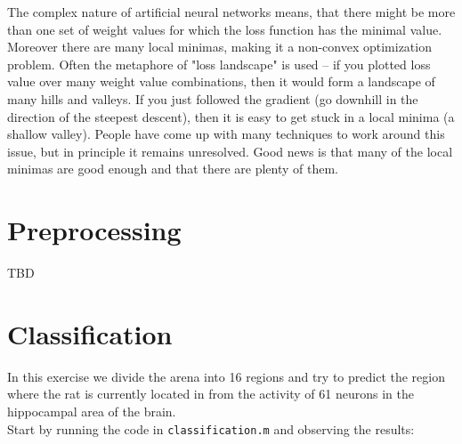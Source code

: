 \documentclass[a4paper,11pt]{article}
\begin{document}
The complex nature of artificial neural networks means, that there might be more than one set of weight values for which the loss function has the minimal value. Moreover there are many local minimas, making it a non-convex optimization problem. Often the metaphore of "loss landscape" is used -- if you plotted loss value over many weight value combinations, then it would form a landscape of many hills and valleys. If you just followed the gradient (go downhill in the direction of the steepest descent), then it is easy to get stuck in a local minima (a shallow valley). People have come up with many techniques to work around this issue, but in principle it remains unresolved. Good news is that many of the local minimas are good enough and that there are plenty of them.

\section{Preprocessing}

TBD

\newpage

%
%
\section{Classification}

In this exercise we divide the arena into 16 regions and try to predict the region where the rat is currently located in from the activity of 61 neurons in the hippocampal area of the brain.\\

Start by running the code in \texttt{classification.m} and observing the results:
\end{document}
